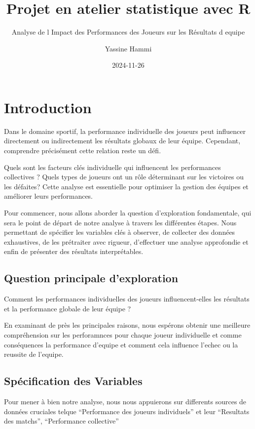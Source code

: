 \documentclass[
  6pt,
]{article}
\title{Projet en atelier statistique avec R}
\subtitle{Analyse de l Impact des Performances des Joueurs sur les
Résultats d equipe}
\author{Yassine Hammi}
\date{2024-11-26}
\begin{document}
\maketitle

{
\setcounter{tocdepth}{6}
\tableofcontents
}
\newpage

\section{Introduction}\label{introduction}

Dans le domaine sportif, la performance individuelle des joueurs peut
influencer directement ou indirectement les résultats globaux de leur
équipe. Cependant, comprendre précisément cette relation reste un défi.

Quels sont les facteurs clés individuelle qui influencent les
performances collectives ? Quels types de joueurs ont un rôle
déterminant sur les victoires ou les défaites? Cette analyse est
essentielle pour optimiser la gestion des équipes et améliorer leurs
performances.

Pour commencer, nous allons aborder la question d'exploration
fondamentale, qui sera le point de départ de notre analyse à travers les
différentes étapes. Nous permettant de spécifier les variables clés à
observer, de collecter des données exhaustives, de les prétraiter avec
rigueur, d'effectuer une analyse approfondie et enfin de présenter des
résultats interprétables.

\subsection{Question principale
d'exploration}\label{question-principale-dexploration}

Comment les performances individuelles des joueurs influencent-elles les
résultats et la performance globale de leur équipe ?

En examinant de près les principales raisons, nous espérons obtenir une
meilleure compréhension sur les perforamnces pour chaque joueur
individuelle et comme conséquences la performance d'equipe et comment
cela influence l'echec ou la reussite de l'equipe.

\subsection{Spécification des
Variables}\label{spuxe9cification-des-variables}

Pour mener à bien notre analyse, nous nous appuierons sur differents
sources de données cruciales telque ``Performance des joueurs
individuels'' et leur ``Resultats des matchs'', ``Performance
collective''
\end{document}
